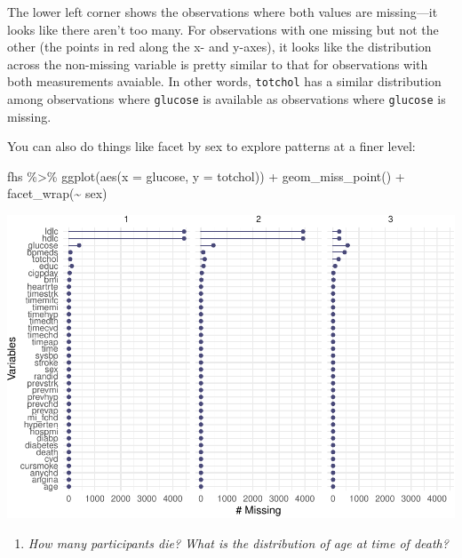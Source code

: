 \documentclass[
]{book}
\newenvironment{Shaded}{\begin{snugshade}}{\end{snugshade}}
\newcommand{\AttributeTok}[1]{\textcolor[rgb]{0.77,0.63,0.00}{#1}}
\newcommand{\FunctionTok}[1]{\textcolor[rgb]{0.00,0.00,0.00}{#1}}
\newcommand{\NormalTok}[1]{#1}
\newcommand{\SpecialCharTok}[1]{\textcolor[rgb]{0.00,0.00,0.00}{#1}}
\providecommand{\tightlist}{%
  \setlength{\itemsep}{0pt}\setlength{\parskip}{0pt}}
\begin{document}
The lower left corner shows the observations where both values are missing---it
looks like there aren't too many. For observations with one missing but not the
other (the points in red along the x- and y-axes), it looks like the distribution
across the non-missing variable is pretty similar to that for observations
with both measurements avaiable. In other words, \texttt{totchol} has a similar
distribution among observations where \texttt{glucose} is available as observations
where \texttt{glucose} is missing.

You can also do things like facet by sex to explore patterns at a finer level:

\begin{Shaded}
\begin{Highlighting}[]
\NormalTok{fhs }\SpecialCharTok{\%\textgreater{}\%} 
  \FunctionTok{ggplot}\NormalTok{(}\FunctionTok{aes}\NormalTok{(}\AttributeTok{x =}\NormalTok{ glucose, }\AttributeTok{y =}\NormalTok{ totchol)) }\SpecialCharTok{+} 
  \FunctionTok{geom\_miss\_point}\NormalTok{() }\SpecialCharTok{+} 
  \FunctionTok{facet\_wrap}\NormalTok{(}\SpecialCharTok{\textasciitilde{}}\NormalTok{ sex)}
\end{Highlighting}
\end{Shaded}

\includegraphics{adv_epi_analysis_files/figure-latex/unnamed-chunk-76-1.pdf}

\begin{enumerate}
\def\labelenumi{\arabic{enumi}.}
\setcounter{enumi}{2}
\tightlist
\item
  \emph{How many participants die? What is the distribution of age at time of death?}
\end{enumerate}
\end{document}

